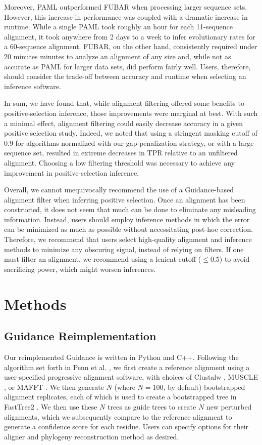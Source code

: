 \documentclass[11pt]{article}
\begin{document}
Moreover, PAML outperformed FUBAR when processing larger sequence sets. However, this increase in performance was coupled with a dramatic increase in runtime. While a single PAML took roughly an hour for each 11-sequence alignment, it took anywhere from 2 days to a week to infer evolutionary rates for a 60-sequence alignment. FUBAR, on the other hand, consistently required under 20 minutes minutes to analyze an alignment of any size and, while not as accurate as PAML for larger data sets, did perform fairly well. Users, therefore, should consider the trade-off between accuracy and runtime when selecting an inference software. 

In sum, we have found that, while alignment filtering offered some benefits to positive-selection inference, those improvements were marginal at best. With such a minimal effect, alignment filtering could easily decrease accuracy in a given positive selection study. Indeed, we noted that using a stringent masking cutoff of 0.9 for algorithms normalized with our gap-penalization strategy, or with a large sequence set, resulted in extreme decreases in TPR relative to an unfiltered alignment. Choosing a low filtering threshold was necessary to achieve any improvement in positive-selection inference.  

Overall, we cannot unequivocally recommend the use of a Guidance-based alignment filter when inferring positive selection. Once an alignment has been constructed, it does not seem that much can be done to eliminate any misleading information. Instead, users should employ inference methods in which the error can be minimized as much as possible without necessitating post-hoc correction. Therefore, we recommend that users select high-quality alignment and inference methods to minimize any obscuring signal, instead of relying on filters. If one must filter an alignment, we recommend using a lenient cutoff ($\leq0.5$) to avoid sacrificing power, which might worsen inferences.


\section*{Methods}

\subsection*{Guidance Reimplementation}
Our reimplemented Guidance is written in Python and C++. Following the algorithm set forth in Penn et al. \citep{Penn2010}, we first create a reference alignment using a user-specified progressive alignment software, with choices of Clustalw \citep{Thompson1994}, MUSCLE \citep{Edgar2004}, or MAFFT \citep{Katoh2002, Katoh2005}. We then generate $N$ (where $N=100$, by default) bootstrapped alignment replicates, each of which is used to create a bootstrapped tree in FastTree2 \citep{Price2010}. We then use these $N$ trees as guide trees to create $N$ new perturbed alignments, which we subsequently compare to the reference alignment to generate a confidence score for each residue. Users can specify options for their aligner and phylogeny reconstruction method as desired.
\end{document}
